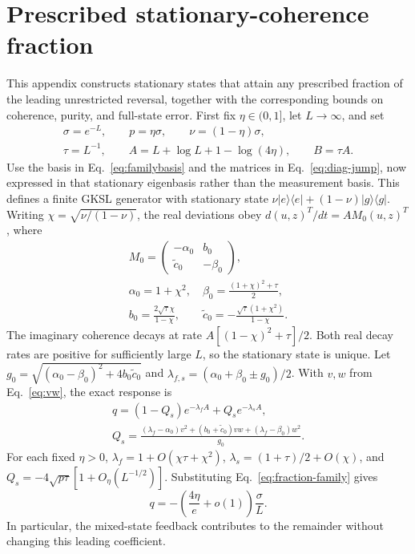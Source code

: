 \documentclass[aps,pra,reprint,amsmath,amssymb,nofootinbib,floatfix,longbibliography]{revtex4-2}
\theoremstyle{aps}
\newcommand{\proj}[1]{|#1\rangle\langle#1|}
\begin{document}
\section{Prescribed stationary-coherence fraction}\label{app:coherence-fraction}

This appendix constructs stationary states that attain any prescribed fraction of the leading unrestricted reversal, together with the corresponding bounds on coherence, purity, and full-state error. First fix $\eta\in(0,1]$, let $L\to\infty$, and set
\begin{equation}\label{eq:fraction-family}
 \begin{gathered}
 \sigma=e^{-L},\qquad p=\eta\sigma,\qquad\nu=(1-\eta)\sigma,\\
 \tau=L^{-1},\qquad A=L+\log L+1-\log(4\eta),\qquad B=\tau A.
 \end{gathered}
\end{equation}
Use the basis in Eq.~\eqref{eq:familybasis} and the matrices in Eq.~\eqref{eq:diag-jump}, now expressed in that stationary eigenbasis rather than the measurement basis. This defines a finite GKSL generator with stationary state $\nu\proj e+(1-\nu)\proj g$. Writing $\chi=\sqrt{\nu/(1-\nu)}$, the real deviations obey $d(u,z)^T/dt=A M_0(u,z)^T$, where
\begin{equation}\label{eq:fraction-matrix}
 \begin{gathered}
 M_0=\begin{pmatrix}-\alpha_0&b_0\\\widetilde c_0&-\beta_0\end{pmatrix},\\
 \alpha_0=1+\chi^2,\quad\beta_0=\frac{(1+\chi)^2+\tau}{2},\\
 b_0=\frac{2\sqrt\tau\chi}{1-\chi},\qquad
 \widetilde c_0=-\frac{\sqrt\tau(1+\chi^2)}{1-\chi}.
 \end{gathered}
\end{equation}
The imaginary coherence decays at rate $A[(1-\chi)^2+\tau]/2$. Both real decay rates are positive for sufficiently large $L$, so the stationary state is unique. Let
$g_0=\sqrt{(\alpha_0-\beta_0)^2+4b_0\widetilde c_0}$ and
$\lambda_{f,s}=(\alpha_0+\beta_0\pm g_0)/2$.
With $v,w$ from Eq.~\eqref{eq:vw}, the exact response is
\begin{equation}\label{eq:fraction-response}
 \begin{gathered}
 q=(1-Q_s)e^{-\lambda_f A}+Q_s e^{-\lambda_s A},\\
 Q_s=\frac{(\lambda_f-\alpha_0)v^2+(b_0+\widetilde c_0)vw
 +(\lambda_f-\beta_0)w^2}{g_0}.
 \end{gathered}
\end{equation}
For each fixed $\eta>0$, $\lambda_f=1+O(\chi\tau+\chi^2)$, $\lambda_s=(1+\tau)/2+O(\chi)$, and $Q_s=-4\sqrt{p\tau}[1+O_\eta(L^{-1/2})]$. Substituting Eq.~\eqref{eq:fraction-family} gives
\begin{equation}\label{eq:fraction-gain}
 q=-\left(\frac{4\eta}{e}+o(1)\right)\frac\sigma L.
\end{equation}
In particular, the mixed-state feedback contributes to the remainder without changing this leading coefficient.
\end{document}

